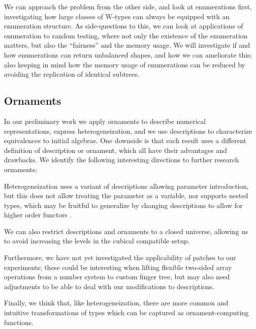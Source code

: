 \documentclass{article}
\theoremstyle{plain}%
\theoremstyle{definition}
\begin{document}
We can approach the problem from the other side, and look at enumerations first, investigating how large classes of W-types can always be equipped with an enumeration structure. As side-questions to this, we can look at applications of enumeration to random testing, where not only the existence of the enumeration matters, but also the ``fairness'' and the memory usage. We will investigate if and how enumerations can return unbalanced shapes, and how we can ameliorate this; also keeping in mind how the memory usage of enumerations can be reduced by avoiding the replication of identical subtrees.

\subsection{Ornaments}
In our preliminary work we apply ornaments to describe numerical representations, express heterogeneization, and we use descriptions to characterize equivalences to initial algebras. One downside is that each result uses a different definition of description or ornament, which all have their advantages and drawbacks. We identify the following interesting directions to further research ornaments:

Heterogeneization uses a variant of descriptions allowing parameter introduction, but this does not allow treating the parameter as a variable, nor supports nested types, which may be fruitful to generalize by changing descriptions to allow for higher order functors \cite{initenough}.

We can also restrict descriptions and ornaments to a closed universe, allowing us to avoid increasing the levels in the cubical compatible setup.  

Furthermore, we have not yet investigated the applicability of patches \cite{orntrans} to our experiments; these could be interesting when lifting flexible two-sided array operations from a number system to custom finger tree, but may also need adjustments to be able to deal with our modifications to descriptions.

Finally, we think that, like heterogeneization, there are more common and intuitive transformations of types which can be captured as ornament-computing functions.

\end{document}
